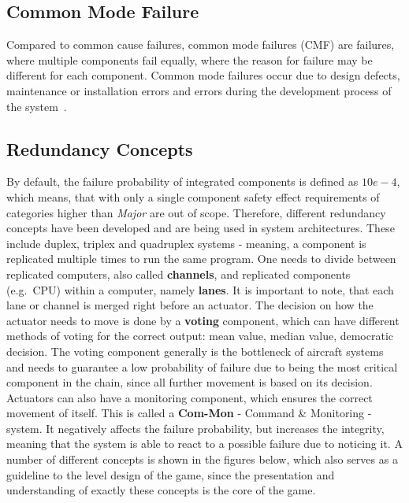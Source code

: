 \subsection{Common Mode Failure}\label{subsec:common-mode-failure}
Compared to common cause failures, common mode failures (CMF) are failures, where multiple components fail equally, where the reason
for failure may be different for each component.
Common mode failures occur due to design defects, maintenance or installation errors and errors during the development process
of the system~\cite{lfs2,cmf}.

\subsection{Redundancy Concepts}\label{subsec:redundancy-concepts}
By default, the failure probability of integrated components is defined as $10e-4$, which means, that with only a single component
safety effect requirements of categories higher than \textit{Major} are out of scope.
Therefore, different redundancy concepts have been developed and are being used in system architectures.
These include duplex, triplex and quadruplex systems - meaning, a component is replicated multiple times to run the same program.
One needs to divide between replicated computers, also called \textbf{channels}, and replicated components (e.g.\ CPU) within a computer,
namely \textbf{lanes}.
It is important to note, that each lane or channel is merged right before an actuator.
The decision on how the actuator needs to move is done by a \textbf{voting} component, which can have different methods of voting
for the correct output: mean value, median value, democratic decision.
The voting component generally is the bottleneck of aircraft systems and needs to guarantee a low probability of failure
due to being the most critical component in the chain, since all further movement is based on its decision.
Actuators can also have a monitoring component, which ensures the correct movement of itself.
This is called a \textbf{Com-Mon} - Command \& Monitoring - system.
It negatively affects the failure probability, but increases the integrity, meaning that the system is able to react to a possible failure due
to noticing it.
A number of different concepts is shown in the figures below, which also serves as a guideline to the level design of the game,
since the presentation and understanding of exactly these concepts is the core of the game.
\\
